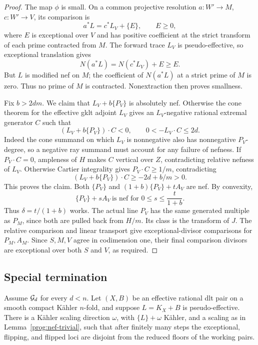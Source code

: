 \begin{proof}
The map \(\phi\) is small. On a common projective resolution
\(a:W'\to M\), \(c:W'\to V\), its comparison is
\[
             a^*L=c^*L_V+\{E\},\qquad E\geq0,
\]
where \(E\) is exceptional over \(V\) and has positive coefficient
at the strict transform of each prime contracted from \(M\).
The forward trace \(L_V\) is pseudo-effective, so exceptional
translation gives
\[
                  N(a^*L)=N(c^*L_V)+E\geq E.
\]
But \(L\) is modified nef on \(M\); the coefficient of
\(N(a^*L)\) at a strict prime of \(M\) is zero. Thus no prime of
\(M\) is contracted. Nonextraction then proves smallness.

Fix \(b>2dm\). We claim that \(L_V+b\{P_V\}\) is absolutely
nef. Otherwise the cone theorem for the effective gklt adjoint
\(L_V\) gives an \(L_V\)-negative rational extremal generator
\(C\) such that
\[
 (L_V+b\{P_V\})\cdot C<0,\qquad 0<-L_V\cdot C\leq2d.
\]
Indeed the cone summand on which \(L_V\) is nonnegative also has
nonnegative \(P_V\)-degree, so a negative ray summand must account
for any failure of nefness. If \(P_V\cdot C=0\), ampleness of
\(H\) makes \(C\) vertical over \(Z\), contradicting relative
nefness of \(L_V\). Otherwise Cartier integrality gives
\(P_V\cdot C\geq1/m\), contradicting
\[
 (L_V+b\{P_V\})\cdot C\geq-2d+b/m>0.
\]
This proves the claim. Both \(\{P_V\}\) and
\((1+b)\{P_V\}+tA_V\) are nef. By convexity,
\[
 \{P_V\}+sA_V\ \text{is nef for }0\leq s\leq\frac{t}{1+b}.
\]
Thus \(\delta=t/(1+b)\) works. The actual line \(P_V\) has the
same generated multiple as \(P_M\), since both are pulled back from
\(H/m\). Its class is the transform of \(J\).
The relative comparison and linear transport give exceptional-divisor
comparisons for \(P_M,A_M\). Since \(S,M,V\) agree in codimension
one, their final comparison divisors are exceptional over both \(S\)
and \(V\), as required.
\end{proof}

\subsection{Special termination}

\begin{theorem}
\label{prog:special-termination}
Assume \(\mathcal G_d\) for every \(d<n\).  Let \((X,B)\) be an
effective rational dlt pair on a smooth compact Kähler
\(n\)-fold, and suppose \(L=K_X+B\) is pseudo-effective.
There is a Kähler scaling direction \(\omega\), with
\(\{L\}+\omega\) Kähler, and a scaling as in
Lemma~\ref{prog:nef-trivial}, such that after finitely many
steps the exceptional, flipping, and flipped loci are disjoint
from the reduced floors of the working pairs.
\end{theorem}

